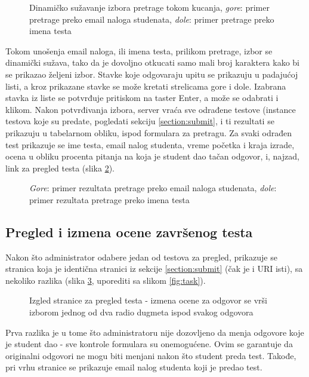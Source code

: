 \begin{figure}[h]
\centering
{}
\caption{Dinamičko sužavanje izbora pretrage tokom kucanja, \textit{gore}: primer pretrage preko email naloga studenata, \textit{dole}: primer pretrage preko imena testa}
\label{fig:assignments-admin}
\end{figure}

Tokom unošenja email naloga, ili imena testa, prilikom pretrage, izbor se dinamički sužava, tako da je dovoljno otkucati samo mali broj karaktera kako bi se prikazao željeni izbor. Stavke koje odgovaraju upitu se prikazuju u padajućoj listi, a kroz prikazane stavke se može kretati strelicama gore i dole. Izabrana stavka iz liste se potvrđuje pritiskom na taster Enter, a može se odabrati i klikom. Nakon potvrđivanja izbora, server vraća sve odrađene testove (instance testova koje su predate, pogledati sekciju \ref{section:submit}, i ti rezultati se prikazuju u tabelarnom obliku, ispod formulara za pretragu. Za svaki odrađen test prikazuje se ime testa, email nalog studenta, vreme početka i kraja izrade, ocena u obliku procenta pitanja na koja je student dao tačan odgovor, i, najzad, link za pregled testa (slika \ref{fig:assignments-admin-results}).
\begin{figure}[h]
\centering
{}
\caption{\textit{Gore}: primer rezultata pretrage preko email naloga studenata, \textit{dole}: primer rezultata pretrage preko imena testa}
\label{fig:assignments-admin-results}
\end{figure}

\subsection{Pregled i izmena ocene završenog testa}
Nakon što administrator odabere jedan od testova za pregled, prikazuje se stranica koja je identična stranici iz sekcije \ref{section:submit} (čak je i URI isti), sa nekoliko razlika (slika \ref{fig:task-admin}, uporediti sa slikom \ref{fig:task}).
\begin{figure}[h]
\centering
{}
\caption{Izgled stranice za pregled testa - izmena ocene za odgovor se vrši izborom jednog od dva radio dugmeta ispod svakog odgovora}
\label{fig:task-admin}
\end{figure}
Prva razlika je u tome što administratoru nije dozovljeno da menja odgovore koje je student dao - sve kontrole formulara su onemogućene. Ovim se garantuje da originalni odgovori ne mogu biti menjani nakon što student preda test. Takođe, pri vrhu stranice se prikazuje email nalog studenta koji je predao test.

